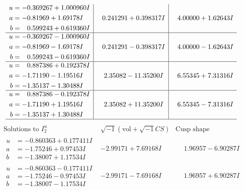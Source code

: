 \documentclass[1p]{elsarticle_modified}
\theoremstyle{definition}
\newcommand{\I}{\sqrt{-1}}
\begin{document}
$$\begin{array}{c|c|c}
\begin{aligned}
u &= -0.369267 + 1.000960 I \\
a &= -0.81969 + 1.69178 I \\
b &= \phantom{-}0.599243 + 0.619360 I\end{aligned}
 & \phantom{-}0.241291 + 0.398317 I & \phantom{-}4.00000 + 1.62643 I \\ \hline\begin{aligned}
u &= -0.369267 - 1.000960 I \\
a &= -0.81969 - 1.69178 I \\
b &= \phantom{-}0.599243 - 0.619360 I\end{aligned}
 & \phantom{-}0.241291 - 0.398317 I & \phantom{-}4.00000 - 1.62643 I \\ \hline\begin{aligned}
u &= \phantom{-}0.887386 + 0.192378 I \\
a &= -1.71190 - 1.19516 I \\
b &= -1.35137 - 1.30488 I\end{aligned}
 & \phantom{-}2.35082 - 11.35200 I & \phantom{-}6.55345 + 7.31316 I \\ \hline\begin{aligned}
u &= \phantom{-}0.887386 - 0.192378 I \\
a &= -1.71190 + 1.19516 I \\
b &= -1.35137 + 1.30488 I\end{aligned}
 & \phantom{-}2.35082 + 11.35200 I & \phantom{-}6.55345 - 7.31316 I\\
 \hline 
 \end{array}$$\newpage$$\begin{array}{c|c|c}  
\text{Solutions to }I^u_{2}& \I (\text{vol} + \sqrt{-1}CS) & \text{Cusp shape}\\
 \hline 
\begin{aligned}
u &= -0.860363 + 0.177411 I \\
a &= -1.75246 + 0.97453 I \\
b &= -1.38007 + 1.17534 I\end{aligned}
 & -2.99171 + 7.69168 I & \phantom{-}1.96957 - 6.90287 I \\ \hline\begin{aligned}
u &= -0.860363 - 0.177411 I \\
a &= -1.75246 - 0.97453 I \\
b &= -1.38007 - 1.17534 I\end{aligned}
 & -2.99171 - 7.69168 I & \phantom{-}1.96957 + 6.90287 I \\ \hline\begin{aligned}

\end{aligned}
\end{array}$$
\end{document}
